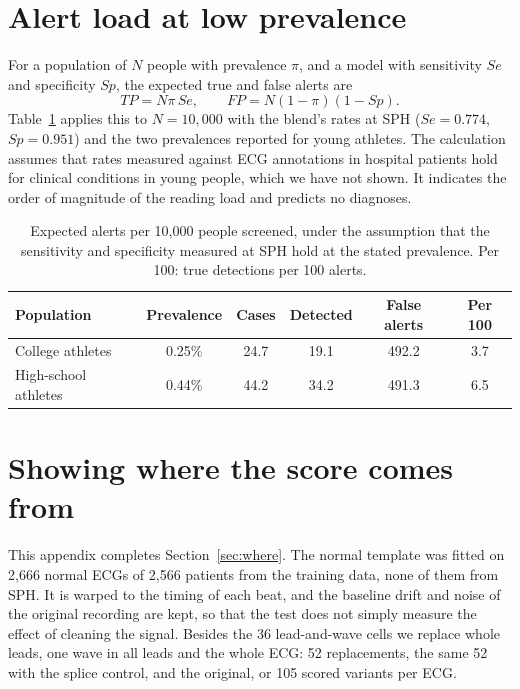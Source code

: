 \documentclass[letterpaper,11pt]{article}
\begin{document}
\section{Alert load at low prevalence}
\label{app:projection}

For a population of $N$ people with prevalence $\pi$, and a model with sensitivity $Se$ and specificity $Sp$, the expected true and false alerts are
\begin{equation}
  TP = N \pi \, Se, \qquad FP = N (1 - \pi)(1 - Sp).
\end{equation}
Table~\ref{tab:projection} applies this to $N = 10{,}000$ with the blend's rates at SPH ($Se = 0.774$, $Sp = 0.951$) and the two prevalences reported for young athletes. The calculation assumes that rates measured against ECG annotations in hospital patients hold for clinical conditions in young people, which we have not shown. It indicates the order of magnitude of the reading load and predicts no diagnoses.

\begin{table}[H]
  \centering
  \caption{Expected alerts per 10,000 people screened, under the assumption that the sensitivity and specificity measured at SPH hold at the stated prevalence. Per 100: true detections per 100 alerts.}
  \label{tab:projection}
  \small
  \begin{tabular}{lccccc}
    \toprule
    Population & Prevalence & Cases & Detected & False alerts & Per 100 \\
    \midrule
    College athletes \parencite{drezner2016electrocardiographic} & 0.25\% & 24.7 & 19.1 & 492.2 & 3.7 \\
    High-school athletes \parencite{williams2019performance} & 0.44\% & 44.2 & 34.2 & 491.3 & 6.5 \\
    \bottomrule
  \end{tabular}
\end{table}

\section{Showing where the score comes from}
\label{app:where}

This appendix completes Section~\ref{sec:where}. The normal template was fitted on 2,666 normal ECGs of 2,566 patients from the training data, none of them from SPH. It is warped to the timing of each beat, and the baseline drift and noise of the original recording are kept, so that the test does not simply measure the effect of cleaning the signal. Besides the 36 lead-and-wave cells we replace whole leads, one wave in all leads and the whole ECG: 52 replacements, the same 52 with the splice control, and the original, or 105 scored variants per ECG.
\end{document}
